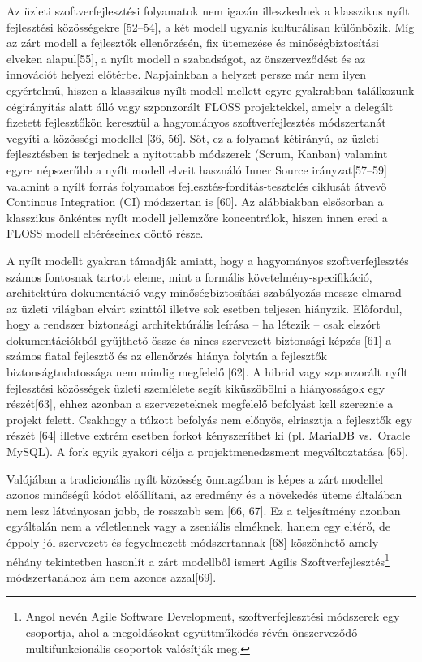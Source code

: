 \documentclass[12pt,magyar,a4paper,oneside]{scrreprt}
\begin{document}
Az üzleti szoftverfejlesztési folyamatok nem igazán illeszkednek a
klasszikus nyílt fejlesztési közösségekre {[}52--54{]}, a két modell
ugyanis kulturálisan különbözik. Míg az zárt modell a fejlesztők
ellenőrzésén, fix ütemezése és minőségbiztosítási elveken
alapul{[}55{]}, a nyílt modell a szabadságot, az önszerveződést és az
innovációt helyezi előtérbe. Napjainkban a helyzet persze már nem ilyen
egyértelmű, hiszen a klasszikus nyílt modell mellett egyre gyakrabban
találkozunk cégirányítás alatt álló vagy szponzorált FLOSS projektekkel,
amely a delegált fizetett fejlesztőkön keresztül a hagyományos
szoftverfejlesztés módszertanát vegyíti a közösségi modellel {[}36,
56{]}. Sőt, ez a folyamat kétirányú, az üzleti fejlesztésben is
terjednek a nyitottabb módszerek (Scrum, Kanban) valamint egyre
népszerűbb a nyílt modell elveit használó Inner Source
irányzat{[}57--59{]} valamint a nyílt forrás folyamatos
fejlesztés-fordítás-tesztelés ciklusát átvevő Continous Integration (CI)
módszertan is {[}60{]}. Az alábbiakban elsősorban a klasszikus önkéntes
nyílt modell jellemzőre koncentrálok, hiszen innen ered a FLOSS modell
eltéréseinek döntő része.

A nyílt modellt gyakran támadják amiatt, hogy a hagyományos
szoftverfejlesztés számos fontosnak tartott eleme, mint a formális
követelmény-specifikáció, architektúra dokumentáció vagy
minőségbiztosítási szabályozás messze elmarad az üzleti világban elvárt
szinttől illetve sok esetben teljesen hiányzik. Előfordul, hogy a
rendszer biztonsági architektúrális leírása -- ha létezik -- csak
elszórt dokumentációkból gyűjthető össze és nincs szervezett biztonsági
képzés {[}61{]} a számos fiatal fejlesztő és az ellenőrzés hiánya
folytán a fejlesztők biztonságtudatossága nem mindig megfelelő {[}62{]}.
A hibrid vagy szponzorált nyílt fejlesztési közösségek üzleti szemlélete
segít kiküszöbölni a hiányosságok egy részét{[}63{]}, ehhez azonban a
szervezeteknek megfelelő befolyást kell szereznie a projekt felett.
Csakhogy a túlzott befolyás nem előnyös, elriasztja a fejlesztők egy
részét {[}64{]} illetve extrém esetben forkot kényszeríthet ki (pl.
MariaDB vs.~Oracle MySQL). A fork egyik gyakori célja a
projektmenedzsment megváltoztatása {[}65{]}.

Valójában a tradicionális nyílt közösség önmagában is képes a zárt
modellel azonos minőségű kódot előállítani, az eredmény és a növekedés
üteme általában nem lesz látványosan jobb, de rosszabb sem {[}66, 67{]}.
Ez a teljesítmény azonban egyáltalán nem a véletlennek vagy a zseniális
elméknek, hanem egy eltérő, de éppoly jól szervezett és fegyelmezett
módszertannak {[}68{]} köszönhető amely néhány tekintetben hasonlít a
zárt modellből ismert Agilis Szoftverfejlesztés\footnote{Angol nevén
  Agile Software Development, szoftverfejlesztési módszerek egy
  csoportja, ahol a megoldásokat együttműködés révén önszerveződő
  multifunkcionális csoportok valósítják meg.} módszertanához ám nem
azonos azzal{[}69{]}.
\end{document}
